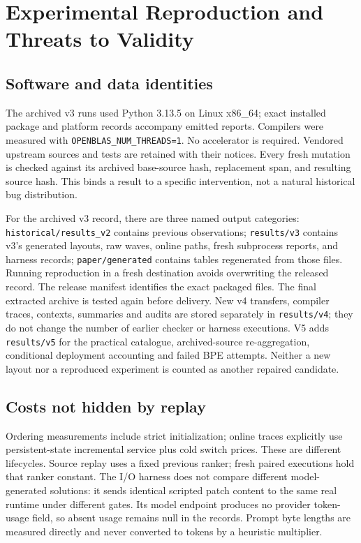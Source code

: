 \section{Experimental Reproduction and Threats to Validity}
\subsection{Software and data identities}
The archived v3 runs used Python 3.13.5 on Linux x86\_64; exact installed package and platform records accompany emitted reports. Compilers were measured with \texttt{OPENBLAS\_NUM\_THREADS=1}. No accelerator is required. Vendored upstream sources and tests are retained with their notices. Every fresh mutation is checked against its archived base-source hash, replacement span, and resulting source hash. This binds a result to a specific intervention, not a natural historical bug distribution.

For the archived v3 record, there are three named output categories: \texttt{historical/results\_v2} contains previous observations; \texttt{results/v3} contains v3's generated layouts, raw waves, online paths, fresh subprocess reports, and harness records; \texttt{paper/generated} contains tables regenerated from those files. Running reproduction in a fresh destination avoids overwriting the released record. The release manifest identifies the exact packaged files. The final extracted archive is tested again before delivery. New v4 transfers, compiler traces, contexts, summaries and audits are stored separately in \texttt{results/v4}; they do not change the number of earlier checker or harness executions. V5 adds \texttt{results/v5} for the practical catalogue, archived-source re-aggregation, conditional deployment accounting and failed BPE attempts. Neither a new layout nor a reproduced experiment is counted as another repaired candidate.

\subsection{Costs not hidden by replay}
Ordering measurements include strict initialization; online traces explicitly use persistent-state incremental service plus cold switch prices. These are different lifecycles. Source replay uses a fixed previous ranker; fresh paired executions hold that ranker constant. The I/O harness does not compare different model-generated solutions: it sends identical scripted patch content to the same real runtime under different gates. Its model endpoint produces no provider token-usage field, so absent usage remains null in the records. Prompt byte lengths are measured directly and never converted to tokens by a heuristic multiplier.

